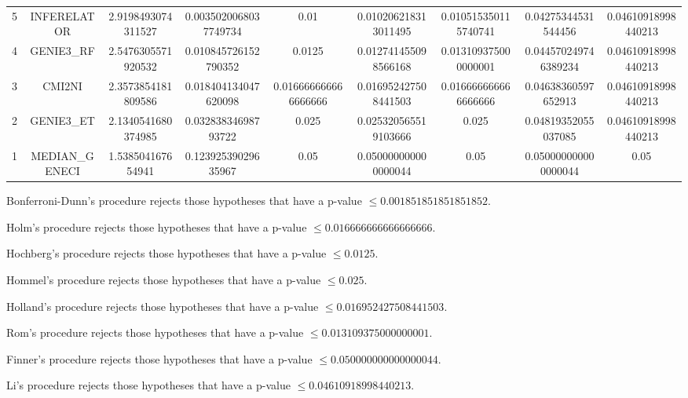 \documentclass[a4paper,10pt]{article}
\begin{document}
\begin{landscape}
\begin{table}[!htp]
\begin{tabular}{ccccccccc}
5&INFERELATOR&2.9198493074311527&0.0035020068037749734&0.01&0.010206218313011495&0.010515350115740741&0.04275344531544456&0.04610918998440213\\
4&GENIE3_RF&2.5476305571920532&0.010845726152790352&0.0125&0.012741455098566168&0.013109375000000001&0.044570249746389234&0.04610918998440213\\
3&CMI2NI&2.3573854181809586&0.018404134047620098&0.016666666666666666&0.016952427508441503&0.016666666666666666&0.04638360597652913&0.04610918998440213\\
2&GENIE3_ET&2.1340541680374985&0.03283834698793722&0.025&0.025320565519103666&0.025&0.04819352055037085&0.04610918998440213\\
1&MEDIAN_GENECI&1.538504167654941&0.12392539029635967&0.05&0.050000000000000044&0.05&0.050000000000000044&0.05\\
\hline
\end{tabular}
\end{table}
Bonferroni-Dunn's procedure rejects those hypotheses that have a p-value $\le0.001851851851851852$.


Holm's procedure rejects those hypotheses that have a p-value $\le0.016666666666666666$.


Hochberg's procedure rejects those hypotheses that have a p-value $\le0.0125$.


Hommel's procedure rejects those hypotheses that have a p-value $\le0.025$.


Holland's procedure rejects those hypotheses that have a p-value $\le0.016952427508441503$.


Rom's procedure rejects those hypotheses that have a p-value $\le0.013109375000000001$.


Finner's procedure rejects those hypotheses that have a p-value $\le0.050000000000000044$.


Li's procedure rejects those hypotheses that have a p-value $\le0.04610918998440213$.



\newpage


\end{landscape}
\end{document}
